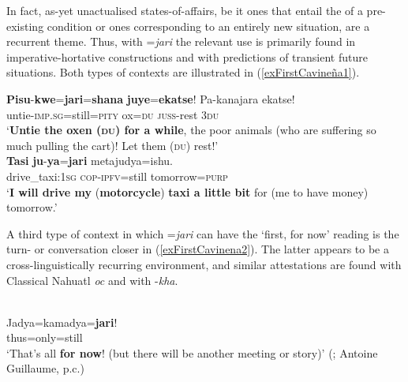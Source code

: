 In fact, as-yet unactualised states-of-affairs, be it ones that entail the  of a pre-existing condition or ones corresponding to an entirely new situation, are a recurrent theme. Thus, with  \mbox{=\textit{jari}} the relevant use is primarily found in imperative-hortative constructions and with predictions of transient future situations. Both types of contexts are illustrated in (\ref{exFirstCavineña1}).

\begin{exe}
	\ex \label{exFirstCavineña1}
	\begin{xlist}
		\exi{}
		\ex\label{exFirstCavineñaRest}
		\gll \textbf{Pisu}-\textbf{kwe}=\textbf{jari}=\textbf{shana} \textbf{juye}=\textbf{ekatse}! Pa-kanajara ekatse!\\
	untie-\textsc{imp}.\textsc{sg}=still=\textsc{pity} ox=\textsc{du} \textsc{juss}-rest 3\textsc{du}\\
		\glt \lq \textbf{Untie the oxen (\textsc{du}) for a while}, the poor animals (who are suffering so much pulling the cart)! Let them (\textsc{du}) rest!'
		\\\parencite[655]{Guillaume2008}	
		\ex
		\gll \textbf{Tasi} \textbf{ju}-\textbf{ya}=\textbf{jari} metajudya=ishu.\\
	drive\_taxi:1\textsc{sg} \textsc{cop}-\textsc{ipfv}=still tomorrow=\textsc{purp}\\
	\glt \lq\textbf{I will drive my} (\textbf{motorcycle}) \textbf{taxi a little bit} for (me to have money) tomorrow.' \parencite[662]{Guillaume2008}
	\end{xlist}
\end{exe}

A third type of context in which \mbox{=\textit{jari}} can have the \lq first, for now\rq{ }reading is the turn- or conversation closer in (\ref{exFirstCavinena2}). The latter appears to be a cross-linguistically recurring environment, and similar attestations are found with Classical Nahuatl \textit{oc} and with  \mbox{-\textit{kha}}.

\begin{exe}
	\ex {}\label{exFirstCavinena2}\\
	\gll Jadya=kamadya=\textbf{jari}!\\
	thus=only=still\\
	\glt \lq That's all \textbf{for now}! (but there will be another meeting or story)' (\cite[662]{Guillaume2008}; Antoine Guillaume, p.c.)		
\end{exe}


